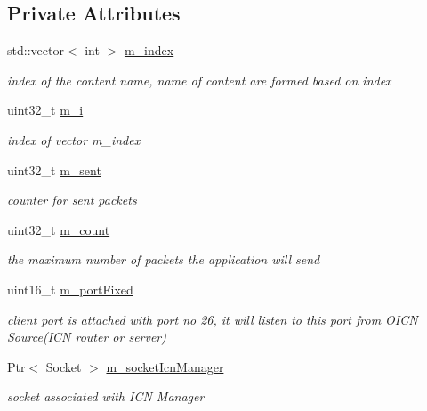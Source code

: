 \subsection*{Private Attributes}
\begin{DoxyCompactItemize}
\item 
std\-::vector$<$ int $>$ \hyperlink{classns3_1_1OicnClient_aee7af038133594a358a77ea3ccece6d3}{m\-\_\-index}
\begin{DoxyCompactList}\small\item\em index of the content name, name of content are formed based on index \end{DoxyCompactList}\item 
uint32\-\_\-t \hyperlink{classns3_1_1OicnClient_a327312bc75b569a1982003fd61e3e45e}{m\-\_\-i}
\begin{DoxyCompactList}\small\item\em index of vector m\-\_\-index \end{DoxyCompactList}\item 
uint32\-\_\-t \hyperlink{classns3_1_1OicnClient_a5a15019661aa3b479f872b42c601cf36}{m\-\_\-sent}
\begin{DoxyCompactList}\small\item\em counter for sent packets \end{DoxyCompactList}\item 
uint32\-\_\-t \hyperlink{classns3_1_1OicnClient_af43386351e66788b1a53aa51b8a3d481}{m\-\_\-count}
\begin{DoxyCompactList}\small\item\em the maximum number of packets the application will send \end{DoxyCompactList}\item 
uint16\-\_\-t \hyperlink{classns3_1_1OicnClient_a96e719be70f2eb12ff391caf0a41367d}{m\-\_\-port\-Fixed}
\begin{DoxyCompactList}\small\item\em client port is attached with port no 26, it will listen to this port from O\-I\-C\-N Source(\-I\-C\-N router or server) \end{DoxyCompactList}\item 
Ptr$<$ Socket $>$ \hyperlink{classns3_1_1OicnClient_a6f062f8c4a35ad072f301141d986ba77}{m\-\_\-socket\-Icn\-Manager}
\begin{DoxyCompactList}\small\item\em socket associated with I\-C\-N Manager \end{DoxyCompactList}\item 

\end{DoxyCompactItemize}
